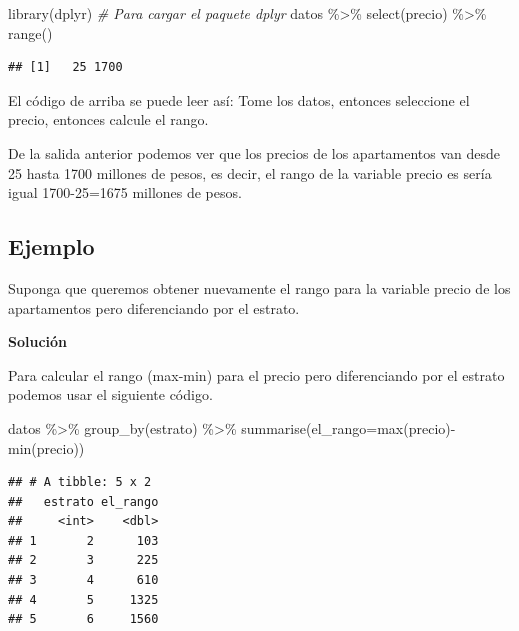 \documentclass[
]{book}
\makeatletter
\newenvironment{Shaded}{\begin{snugshade}}{\end{snugshade}}
\newcommand{\AttributeTok}[1]{\textcolor[rgb]{0.77,0.63,0.00}{#1}}
\newcommand{\CommentTok}[1]{\textcolor[rgb]{0.56,0.35,0.01}{\textit{#1}}}
\newcommand{\FunctionTok}[1]{\textcolor[rgb]{0.00,0.00,0.00}{#1}}
\newcommand{\NormalTok}[1]{#1}
\newcommand{\SpecialCharTok}[1]{\textcolor[rgb]{0.00,0.00,0.00}{#1}}
\newenvironment{kframe}{%
\medskip{}
\setlength{\fboxsep}{.8em}
 \def\at@end@of@kframe{}%
 \ifinner\ifhmode%
  \def\at@end@of@kframe{\end{minipage}}%
  \begin{minipage}{\columnwidth}%
 \fi\fi%
 \def\FrameCommand##1{\hskip\@totalleftmargin \hskip-\fboxsep
 \colorbox{shadecolor}{##1}\hskip-\fboxsep
     \hskip-\linewidth \hskip-\@totalleftmargin \hskip\columnwidth}%
 \MakeFramed {\advance\hsize-\width
   \@totalleftmargin\z@ \linewidth\hsize
   \@setminipage}}%
 {\par\unskip\endMakeFramed%
 \at@end@of@kframe}
\renewenvironment{Shaded}{\begin{kframe}}{\end{kframe}}
\newenvironment{rmdblock}[1]
  {
  \begin{itemize}
  \renewcommand{\labelitemi}{
    \raisebox{-.7\height}[0pt][0pt]{
      {\setkeys{Gin}{width=3em,keepaspectratio}\texttt{[image: images/\#1]}}
    }
  }
  \setlength{\fboxsep}{1em}
  \begin{kframe}
  \item
  }
  {
  \end{kframe}
  \end{itemize}
  }
\newenvironment{rmdnote}
  {\begin{rmdblock}{note}}
  {\end{rmdblock}}
\makeatother
\begin{document}
\begin{Shaded}
\begin{Highlighting}[]
\FunctionTok{library}\NormalTok{(dplyr) }\CommentTok{\# Para cargar el paquete dplyr}
\NormalTok{datos }\SpecialCharTok{\%\textgreater{}\%} \FunctionTok{select}\NormalTok{(precio) }\SpecialCharTok{\%\textgreater{}\%} \FunctionTok{range}\NormalTok{()}
\end{Highlighting}
\end{Shaded}

\begin{verbatim}
## [1]   25 1700
\end{verbatim}

\begin{rmdnote}
El código de arriba se puede leer así: Tome los datos, entonces seleccione el precio, entonces calcule el rango.
\end{rmdnote}

De la salida anterior podemos ver que los precios de los apartamentos van desde 25 hasta 1700 millones de pesos, es decir, el rango de la variable precio es sería igual 1700-25=1675 millones de pesos.

\hypertarget{ejemplo-36}{%
\subsection*{Ejemplo}\label{ejemplo-36}}

Suponga que queremos obtener nuevamente el rango para la variable precio de los apartamentos pero diferenciando por el estrato.

\textbf{Solución}

Para calcular el rango (max-min) para el precio pero diferenciando por el estrato podemos usar el siguiente código.

\begin{Shaded}
\begin{Highlighting}[]
\NormalTok{datos }\SpecialCharTok{\%\textgreater{}\%} 
  \FunctionTok{group\_by}\NormalTok{(estrato) }\SpecialCharTok{\%\textgreater{}\%} 
  \FunctionTok{summarise}\NormalTok{(}\AttributeTok{el\_rango=}\FunctionTok{max}\NormalTok{(precio)}\SpecialCharTok{{-}}\FunctionTok{min}\NormalTok{(precio))}
\end{Highlighting}
\end{Shaded}

\begin{verbatim}
## # A tibble: 5 x 2
##   estrato el_rango
##     <int>    <dbl>
## 1       2      103
## 2       3      225
## 3       4      610
## 4       5     1325
## 5       6     1560
\end{verbatim}
\end{document}
